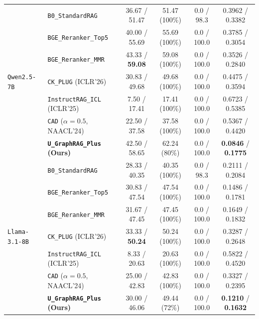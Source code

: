 \documentclass[11pt]{article}
\begin{document}
\begin{table}[t]
{{\begin{tabular}{llcccc}
\midrule
\multirow{7}{*}{\texttt{Qwen2.5-7B}}
& \texttt{B0\_StandardRAG} & 36.67 / 51.47 & 51.47 (100\%) & 0.0 / 98.3 & 0.3962 / 0.3382 \\
& \texttt{BGE\_Reranker\_Top5} & 40.00 / 55.69 & 55.69 (100\%) & 0.0 / 100.0 & 0.3785 / 0.3054 \\
& \texttt{BGE\_Reranker\_MMR} & 43.33 / \textbf{59.08} & 59.08 (100\%) & 0.0 / 100.0 & 0.3526 / 0.2840 \\
& \texttt{CK\_PLUG} (ICLR'26) & 30.83 / 49.68 & 49.68 (100\%) & 0.0 / 100.0 & 0.4475 / 0.3594 \\
& \texttt{InstructRAG\_ICL} (ICLR'25) & 7.50 / 17.41 & 17.41 (100\%) & 0.0 / 100.0 & 0.6723 / 0.5385 \\
& \texttt{CAD} ($\alpha=0.5$, NAACL'24) & 22.50 / 37.58 & 37.58 (100\%) & 0.0 / 100.0 & 0.5367 / 0.4420 \\
& \textbf{\texttt{U\_GraphRAG\_Plus} (Ours)} & 42.50 / 58.65 & 62.24 (80\%) & 0.0 / 100.0 & \textbf{0.0846} / \textbf{0.1775} \\
\midrule
\multirow{7}{*}{\texttt{Llama-3.1-8B}}
& \texttt{B0\_StandardRAG} & 28.33 / 40.35 & 40.35 (100\%) & 0.0 / 98.3 & 0.2111 / 0.2084 \\
& \texttt{BGE\_Reranker\_Top5} & 30.83 / 47.54 & 47.54 (100\%) & 0.0 / 100.0 & 0.1486 / 0.1781 \\
& \texttt{BGE\_Reranker\_MMR} & 31.67 / 47.45 & 47.45 (100\%) & 0.0 / 100.0 & 0.1649 / 0.1832 \\
& \texttt{CK\_PLUG} (ICLR'26) & 33.33 / \textbf{50.24} & 50.24 (100\%) & 0.0 / 100.0 & 0.3287 / 0.2648 \\
& \texttt{InstructRAG\_ICL} (ICLR'25) & 8.33 / 20.63 & 20.63 (100\%) & 0.0 / 100.0 & 0.5822 / 0.4520 \\
& \texttt{CAD} ($\alpha=0.5$, NAACL'24) & 25.00 / 42.83 & 42.83 (100\%) & 0.0 / 100.0 & 0.3327 / 0.2395 \\
& \textbf{\texttt{U\_GraphRAG\_Plus} (Ours)} & 30.00 / 46.06 & 49.44 (72\%) & 0.0 / 100.0 & \textbf{0.1210} / \textbf{0.1632} \\
\bottomrule
\end{tabular}
}}
\end{table}
\end{document}
